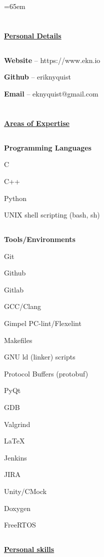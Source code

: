 \documentclass[6pt]{article}
\begin{document}
%
%
\begin{minipage}{13em}
\textheight=65em
\section*{}
{\underline{\textbf{Personal Details}}}
\subsection*{}
{\small {\bfseries Website} -- https://www.ekn.io

{\bfseries Github} -- eriknyquist

{\bfseries Email} -- eknyquist@gmail.com}

\section*{}
{\underline{\textbf{Areas of Expertise}}}
\subsection*{}
{\textbf{Programming Languages}}

{\small C

C++

Python

UNIX shell scripting (bash, sh)}

\subsection*{}
{\textbf{Tools/Environments}}

{\small Git

Github

Gitlab

GCC/Clang

Gimpel PC-lint/Flexelint

Makefiles

GNU ld (linker) scripts

Protocol Buffers (protobuf)

PyQt

GDB

Valgrind

{\LaTeX}

Jenkins

JIRA

Unity/CMock

Doxygen

FreeRTOS}

\subsection*{}
{\underline{\textbf{Personal skills}}}


\end{minipage}
\end{document}
